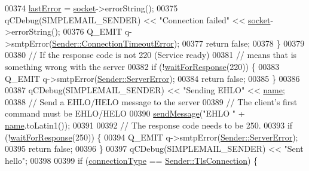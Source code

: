 \begin{DoxyCode}
00374         \hyperlink{class_simple_mail_1_1_sender_private_a90ae4ff740007836307ede01aad3a277}{lastError} = \hyperlink{class_simple_mail_1_1_sender_private_a223cab47555a39f45f30569328fa20bc}{socket}->errorString();
00375         qCDebug(SIMPLEMAIL\_SENDER) << \textcolor{stringliteral}{"Connection failed"} << \hyperlink{class_simple_mail_1_1_sender_private_a223cab47555a39f45f30569328fa20bc}{socket}->errorString();
00376         Q\_EMIT q->smtpError(\hyperlink{class_simple_mail_1_1_sender_a276560e9e955ab6be451338c3776bf49a103e98eb7c1b1d901137406cba3af5a3}{Sender::ConnectionTimeoutError});
00377         \textcolor{keywordflow}{return} \textcolor{keyword}{false};
00378     \}
00379 
00380     \textcolor{comment}{// If the response code is not 220 (Service ready)}
00381     \textcolor{comment}{// means that is something wrong with the server}
00382     \textcolor{keywordflow}{if} (!\hyperlink{class_simple_mail_1_1_sender_private_af8ba23dc3e1201d303ad1d923235c71c}{waitForResponse}(220)) \{
00383         Q\_EMIT q->smtpError(\hyperlink{class_simple_mail_1_1_sender_a276560e9e955ab6be451338c3776bf49aa5d58da2b004bb7275a92029fe432089}{Sender::ServerError});
00384         \textcolor{keywordflow}{return} \textcolor{keyword}{false};
00385     \}
00386 
00387     qCDebug(SIMPLEMAIL\_SENDER) << \textcolor{stringliteral}{"Sending EHLO"} << \hyperlink{class_simple_mail_1_1_sender_private_a9daecd69dd0c84595a9c3288f98094b4}{name};
00388     \textcolor{comment}{// Send a EHLO/HELO message to the server}
00389     \textcolor{comment}{// The client's first command must be EHLO/HELO}
00390     \hyperlink{class_simple_mail_1_1_sender_private_a01805bb24291bf6cad3a656a16d0bb25}{sendMessage}(\textcolor{stringliteral}{"EHLO "} + \hyperlink{class_simple_mail_1_1_sender_private_a9daecd69dd0c84595a9c3288f98094b4}{name}.toLatin1());
00391 
00392     \textcolor{comment}{// The response code needs to be 250.}
00393     \textcolor{keywordflow}{if} (!\hyperlink{class_simple_mail_1_1_sender_private_af8ba23dc3e1201d303ad1d923235c71c}{waitForResponse}(250)) \{
00394         Q\_EMIT q->smtpError(\hyperlink{class_simple_mail_1_1_sender_a276560e9e955ab6be451338c3776bf49aa5d58da2b004bb7275a92029fe432089}{Sender::ServerError});
00395         \textcolor{keywordflow}{return} \textcolor{keyword}{false};
00396     \}
00397     qCDebug(SIMPLEMAIL\_SENDER) << \textcolor{stringliteral}{"Sent hello"};
00398 
00399     \textcolor{keywordflow}{if} (\hyperlink{class_simple_mail_1_1_sender_private_a2d09eb5d137213e97f10228f8ed68134}{connectionType} == \hyperlink{class_simple_mail_1_1_sender_a89e6a9572b306441237f6b6635729d1aa3461f2931e043fc3ea86a0015c735159}{Sender::TlsConnection}) \{

\end{DoxyCode}
